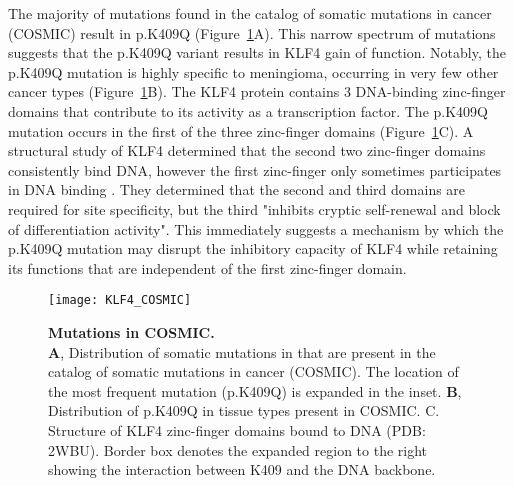 The majority of  mutations found in the catalog of somatic mutations in cancer (COSMIC) result in p.K409Q (Figure~\ref{KLF4_COSMIC}A). This narrow spectrum of mutations suggests that the p.K409Q variant results in KLF4 gain of function. Notably, the p.K409Q mutation is highly specific to meningioma, occurring in very few other cancer types (Figure~\ref{KLF4_COSMIC}B). The KLF4 protein contains 3 DNA-binding zinc-finger domains that contribute to its activity as a transcription factor. The p.K409Q mutation occurs in the first of the three zinc-finger domains (Figure~\ref{KLF4_COSMIC}C). A structural study of KLF4 determined that the second two zinc-finger domains consistently bind DNA, however the first zinc-finger only sometimes participates in DNA binding \citep{schuetz2011}. They determined that the second and third domains are required for site specificity, but the third "inhibits cryptic self-renewal and block of differentiation activity". This immediately suggests a mechanism by which the p.K409Q mutation may disrupt the inhibitory capacity of KLF4 while retaining its functions that are independent of the first zinc-finger domain. 

\begin{figure}[tbp!]
\begin{center}
\texttt{[image: KLF4\_COSMIC]}
\end{center}
\caption[ Mutations in COSMIC]{\textbf{ Mutations in COSMIC. } \\ \textbf{A}, Distribution of somatic mutations in  that are present in the catalog of somatic mutations in cancer (COSMIC). The location of the most frequent mutation (p.K409Q) is expanded in the inset. \textbf{B}, Distribution of  p.K409Q in tissue types present in COSMIC. C. Structure of KLF4 zinc-finger domains bound to DNA (PDB: 2WBU). Border box denotes the expanded region to the right showing the interaction between K409 and the DNA backbone.}
\label{KLF4_COSMIC}
\end{figure}

